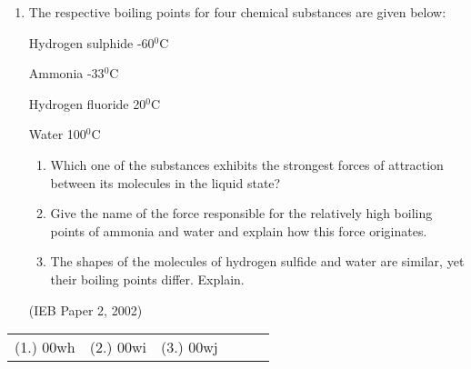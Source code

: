 \begin{eocexercises}{}
\begin{enumerate}
\item{The respective boiling points for four chemical substances are given below:

Hydrogen sulphide -60$^{0}$C

Ammonia -33$^{0}$C

Hydrogen fluoride 20$^{0}$C

Water 100$^{0}$C

\begin{enumerate}
\item{Which one of the substances exhibits the strongest forces of attraction between its molecules in the liquid state?}
\item{Give the name of the force responsible for the relatively high boiling points of ammonia and water and explain how this force originates.}
\item{The shapes of the molecules of hydrogen sulfide and water are similar, yet their boiling points differ. Explain.}
\end{enumerate}

}
(IEB Paper 2, 2002)
\end{enumerate}

\practiceinfo

\begin{tabular}[h]{cccccc}
(1.) 00wh & (2.) 00wi & (3.) 00wj & 
 \end{tabular}
\end{eocexercises}






